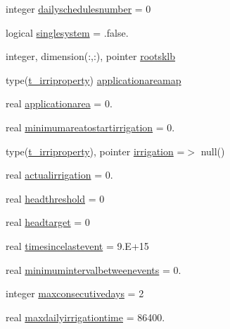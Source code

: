 \begin{DoxyCompactItemize}
\item 
integer \mbox{\hyperlink{structmoduleirrigation_1_1t__irrischedule_a648f09b5cae92a4563298834a5501e14}{dailyschedulesnumber}} = 0
\item 
logical \mbox{\hyperlink{structmoduleirrigation_1_1t__irrischedule_a136224592c0d3f15984e1595e4c0c472}{singlesystem}} = .false.
\item 
integer, dimension(\+:,\+:), pointer \mbox{\hyperlink{structmoduleirrigation_1_1t__irrischedule_acf3ae68777e16ea2490c500d63506a93}{rootsklb}}
\item 
type(\mbox{\hyperlink{structmoduleirrigation_1_1t__irriproperty}{t\+\_\+irriproperty}}) \mbox{\hyperlink{structmoduleirrigation_1_1t__irrischedule_a3971a11a14f532f272d073a51707e824}{applicationareamap}}
\item 
real \mbox{\hyperlink{structmoduleirrigation_1_1t__irrischedule_a719eb8e4995e117a9c60edc046aa994a}{applicationarea}} = 0.
\item 
real \mbox{\hyperlink{structmoduleirrigation_1_1t__irrischedule_a21ad08ad398b32b49b5e6c22c111b3d2}{minimumareatostartirrigation}} = 0.
\item 
type(\mbox{\hyperlink{structmoduleirrigation_1_1t__irriproperty}{t\+\_\+irriproperty}}), pointer \mbox{\hyperlink{structmoduleirrigation_1_1t__irrischedule_ac6338799563bde78e7258bc57596dbb1}{irrigation}} =$>$ null()
\item 
real \mbox{\hyperlink{structmoduleirrigation_1_1t__irrischedule_a5ed129429777aa5f21e5a43c805e4c56}{actualirrigation}} = 0.
\item 
real \mbox{\hyperlink{structmoduleirrigation_1_1t__irrischedule_a2dfebbefcb2c0d3d6ad0c060e045a1d1}{headthreshold}} = 0
\item 
real \mbox{\hyperlink{structmoduleirrigation_1_1t__irrischedule_a22bb154e5557a3604c1d5f7b46380f39}{headtarget}} = 0
\item 
real \mbox{\hyperlink{structmoduleirrigation_1_1t__irrischedule_a52d8247f3759f6ee7604cca68abfd73d}{timesincelastevent}} = 9.\+E+15
\item 
real \mbox{\hyperlink{structmoduleirrigation_1_1t__irrischedule_a50aa653c952c671e6020be1493d00744}{minimumintervalbetweenevents}} = 0.
\item 
integer \mbox{\hyperlink{structmoduleirrigation_1_1t__irrischedule_aace582b15f28a14107ed567225870a7b}{maxconsecutivedays}} = 2
\item 
real \mbox{\hyperlink{structmoduleirrigation_1_1t__irrischedule_a0bbc05dbb45ffbf9a5aace0315e293be}{maxdailyirrigationtime}} = 86400.

\end{DoxyCompactItemize}
